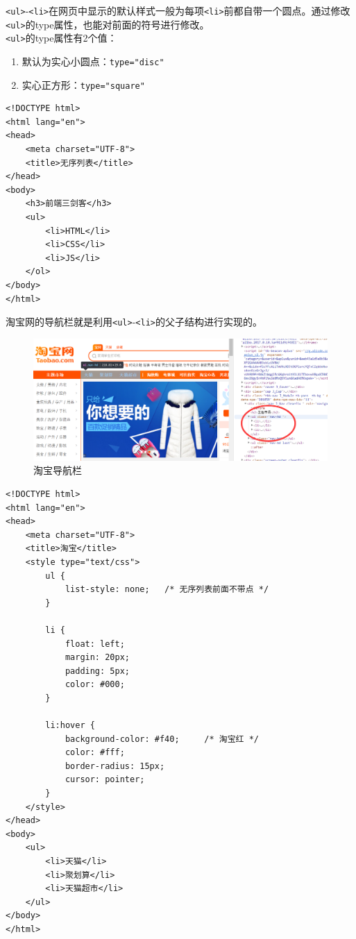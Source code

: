 \lstinline|<ul>|-\lstinline|<li>|在网页中显示的默认样式一般为每项\lstinline|<li>|前都自带一个圆点。通过修改\lstinline|<ul>|的type属性，也能对前面的符号进行修改。 \\

\lstinline|<ul>|的type属性有2个值：

\begin{enumerate}
    \item 默认为实心小圆点：\lstinline|type="disc"|
    \item 实心正方形：\lstinline|type="square"|
\end{enumerate}

\begin{lstlisting}[style=htmlcssjs, title=无序列表]
<!DOCTYPE html>
<html lang="en">
<head>
    <meta charset="UTF-8">
    <title>无序列表</title>
</head>
<body>
    <h3>前端三剑客</h3>
    <ul>
        <li>HTML</li>
        <li>CSS</li>
        <li>JS</li>
    </ol>
</body>
</html>
\end{lstlisting}

淘宝网的导航栏就是利用\lstinline|<ul>|-\lstinline|<li>|的父子结构进行实现的。

\begin{figure}[H]
    \centering
    \includegraphics[scale=0.5]{img/C3/3-2/2.png}
    \caption{淘宝导航栏}
\end{figure}

\begin{lstlisting}[style=htmlcssjs, title=淘宝导航栏]
<!DOCTYPE html>
<html lang="en">
<head>
    <meta charset="UTF-8">
    <title>淘宝</title>
    <style type="text/css">
        ul {
            list-style: none;   /* 无序列表前面不带点 */
        }

        li {
            float: left;
            margin: 20px;
            padding: 5px;
            color: #000;
        }

        li:hover {
            background-color: #f40;     /* 淘宝红 */
            color: #fff;
            border-radius: 15px;
            cursor: pointer;
        }
    </style>
</head>
<body>
    <ul>
        <li>天猫</li>
        <li>聚划算</li>
        <li>天猫超市</li>
    </ul>
</body>
</html>
\end{lstlisting}

